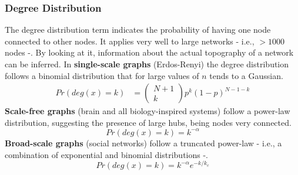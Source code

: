 \subsubsection{Degree Distribution}
The degree distribution term indicates the probability of having one node connected to other nodes. It applies very well
to large networks - i.e., \(>1000\) nodes -. By looking at it, information about the actual topography of a network
can be inferred. In \textbf{single-scale graphs} (Erdos-Renyi) the degree distribution follows a binomial distribution
that for large values of \(n\) tends to a Gaussian.
\begin{align*}
    Pr(deg(x)=k) & = \begin{pmatrix}
                         N+1 \\
                         k
                     \end{pmatrix}
    p^k(1-p)^{N-1-k}
\end{align*}
\textbf{Scale-free graphs} (brain and all biology-inspired systems) follow a power-law distribution, suggesting the
presence of large hubs, being nodes very connected.
\begin{equation*}
    Pr(deg(x)=k)=k^{-\alpha}
\end{equation*}
\textbf{Broad-scale graphs} (social networks) follow a truncated power-law - i.e., a combination of exponential and
binomial distributions -.
\begin{equation*}
    Pr(deg(x)=k)=k^{-\alpha}e^{-k/k_c}
\end{equation*}
